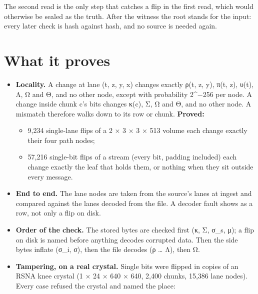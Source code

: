 The second read is the only step that catches a flip in the first read, which would otherwise be sealed as the truth. After the witness the root stands for the input: every later check is hash against hash, and no source is needed again.

\section{\texorpdfstring{What it proves}{What it proves}}

\begin{itemize}
\item \textbf{Locality.} A change at lane (t, z, y, x) changes exactly ρ(t, z, y), π(t, z), υ(t), Λ, Ω and Θ, and no other node, except with probability 2\textasciicircum{}−256 per node. A change inside chunk c's bits changes κ(c), Σ, Ω and Θ, and no other node. A mismatch therefore walks down to its row or chunk. \textbf{Proved:}

\begin{itemize}
\item 9,234 single-lane flips of a 2 × 3 × 3 × 513 volume each change exactly their four path nodes;
\item 57,216 single-bit flips of a stream (every bit, padding included) each change exactly the leaf that holds them, or nothing when they sit outside every message.
\end{itemize}
\item \textbf{End to end.} The lane nodes are taken from the source's lanes at ingest and compared against the lanes decoded from the file. A decoder fault shows as a row, not only a flip on disk.
\item \textbf{Order of the check.} The stored bytes are checked first (κ, Σ, σ\_\allowbreak{}s, μ); a flip on disk is named before anything decodes corrupted data. Then the side bytes inflate (σ\_\allowbreak{}i, σ), then the file decodes (ρ … Λ), then Ω.
\item \textbf{Tampering, on a real crystal.} Single bits were flipped in copies of an RSNA knee crystal (1 × 24 × 640 × 640, 2,400 chunks, 15,386 lane nodes). Every case refused the crystal and named the place:
\end{itemize}

